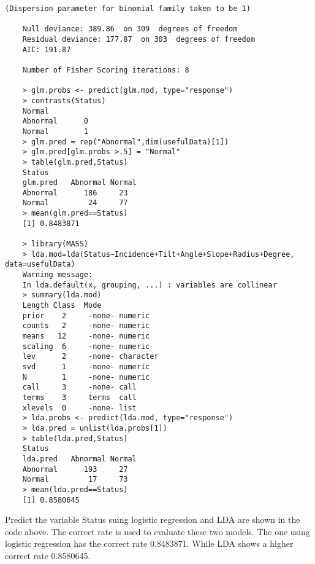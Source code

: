 \documentclass[12pt]{article}
\begin{document}
\begin{lstlisting}[breaklines=true]
	(Dispersion parameter for binomial family taken to be 1)
	
	Null deviance: 389.86  on 309  degrees of freedom
	Residual deviance: 177.87  on 303  degrees of freedom
	AIC: 191.87
	
	Number of Fisher Scoring iterations: 8
	
	> glm.probs <- predict(glm.mod, type="response")
	> contrasts(Status)
	Normal
	Abnormal      0
	Normal        1
	> glm.pred = rep("Abnormal",dim(usefulData)[1])
	> glm.pred[glm.probs >.5] = "Normal"
	> table(glm.pred,Status)
	Status
	glm.pred   Abnormal Normal
	Abnormal      186     23
	Normal         24     77
	> mean(glm.pred==Status)
	[1] 0.8483871
	
	> library(MASS)
	> lda.mod=lda(Status~Incidence+Tilt+Angle+Slope+Radius+Degree, data=usefulData)
	Warning message:
	In lda.default(x, grouping, ...) : variables are collinear
	> summary(lda.mod)
	Length Class  Mode     
	prior    2     -none- numeric  
	counts   2     -none- numeric  
	means   12     -none- numeric  
	scaling  6     -none- numeric  
	lev      2     -none- character
	svd      1     -none- numeric  
	N        1     -none- numeric  
	call     3     -none- call     
	terms    3     terms  call     
	xlevels  0     -none- list     
	> lda.probs <- predict(lda.mod, type="response")
	> lda.pred = unlist(lda.probs[1])
	> table(lda.pred,Status)
	Status
	lda.pred   Abnormal Normal
	Abnormal      193     27
	Normal         17     73
	> mean(lda.pred==Status)
	[1] 0.8580645
	\end{lstlisting}
	Predict the variable Status suing logistic regression and LDA are shown in the code above. The correct rate is used to evaluate these two models. The one using logistic regression has the correct rate 0.8483871. While LDA shows a higher correct rate 0.8580645.\\
	
\end{document}
